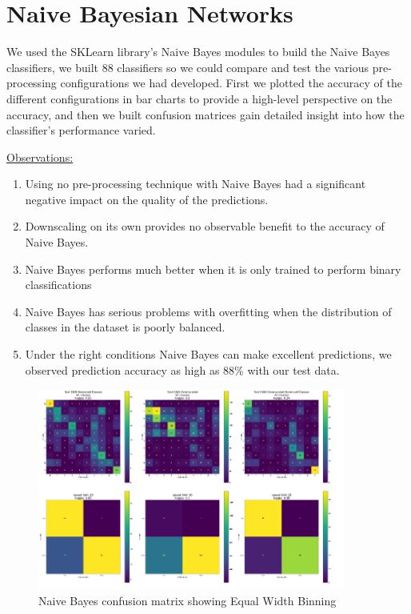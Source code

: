 \documentclass[11pt]{article}
\begin{document}
\section{Naive Bayesian Networks}\label{sec:NaiveBayse}
We used the SKLearn library's Naive Bayes modules to build the Naive Bayes classifiers, we built 88 classifiers so we could compare and test the various pre-processing configurations we had developed. 
First we plotted the accuracy of the different configurations in bar charts to provide a high-level perspective on the accuracy, and then we built confusion matrices gain detailed insight into how the classifier's performance varied.
\par
\underline{Observations:}
\begin{enumerate}
    \item Using no pre-processing technique with Naive Bayes had a significant negative impact on the quality of the predictions.
    \item Downscaling on its own provides no observable benefit to the accuracy of Naive Bayes.
    \item Naive Bayes performs much better when it is only trained to perform binary classifications
    \item Naive Bayes has serious problems with overfitting when the distribution of classes in the dataset is poorly balanced.
    \item Under the right conditions Naive Bayes can make excellent predictions, we observed prediction accuracy as high as 88\% with our test data.
\end{enumerate}

\begin{figure}[H]
  \centering
  \includegraphics[width=0.9\textwidth]{Images/NaiveBayesEWBMatrices.png}
  \caption{Naive Bayes confusion matrix showing Equal Width Binning}
  \label{fig:NaiveBayesEWBConfMat}
\end{figure}
\end{document}
